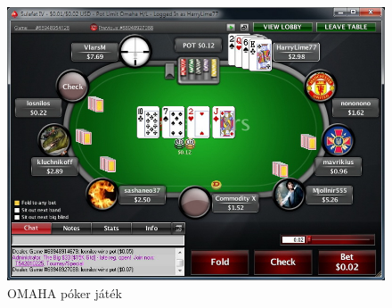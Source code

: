 \begin{figure}[h!]
  \caption{OMAHA póker játék}
  \label{fig:omaha}
  \centering
    \includegraphics[width=\textwidth]{user-documentation/images/omaha.jpg}
\end{figure}

